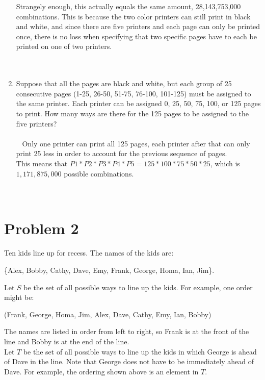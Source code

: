 \documentclass{amsart}
\theoremstyle{definition}
\theoremstyle{Exercise}
\theoremstyle{remark}
\theoremstyle{rule}
\numberwithin{equation}{section}
\begin{document}
\begin{enumerate}[label=(\alph*)]
Strangely enough, this actually equals the same amount, 28,143,753,000 combinations. This is because the two color printers can still print in black and white, and since there are five printers and each page can only be printed once, there is no loss when specifying that two specific pages have to each be printed on one of two printers.
        \\\\\
 \item Suppose that all the pages are black and white, but each group of 25 consecutive pages (1-25, 26-50, 51-75, 76-100, 101-125) must be assigned to the same printer. Each printer can be assigned 0, 25, 50, 75, 100, or 125 pages to print.
How many ways are there for the 125 pages to be assigned to the five printers?\\\\\
Only one printer can print all 125 pages, each printer after that can only print 25 less in order to account for the previous sequence of pages.\\
This means that $P1*P2*P3*P4*P5 = 125 * 100 * 75 * 50 * 25$, which is $1,171,875,000$ possible combinations.
        \\\\\
   \end{enumerate}
 \newpage

\section*{Problem 2}
Ten kids line up for recess. The names of the kids are:\\
\begin{center}
 \{Alex, Bobby, Cathy, Dave, Emy, Frank, George, Homa, Ian, Jim\}.\\
\end{center}
Let $S$ be the set of all possible ways to line up the kids. For example, one order might be:
\begin{center}
  (Frank, George, Homa, Jim, Alex, Dave, Cathy, Emy, Ian, Bobby)\\
\end{center}

The names are listed in order from left to right, so Frank is at the front of the line and Bobby is at the end of the line.\\

Let $T$ be the set of all possible ways to line up the kids in which George is ahead of Dave in the line. Note that George does not have to be immediately ahead of Dave. For example, the ordering shown above is an element in $T$.\\
\end{document}
